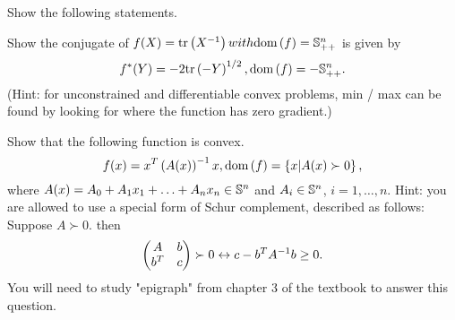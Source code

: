 \documentclass{exam}
\begin{document}
\begin{questions}
    \question Show the following statements.



    \question Show the conjugate of $f(X) = \tr{X^\inv} with \dom{f} = \S_{++}^n$ is given by
    $$f^*(Y) = -2\tr{-Y}^{1 / 2}, \dom{f} = -\S_{++}^n.$$
    (Hint: for unconstrained and differentiable convex problems, min / max can be found by looking for where the function
    has zero gradient.)

    \question Show that the following function is convex.
    $$f(x) = x^T\paren{A(x)}^\inv x, \dom{f} = \cbrac{x | A(x) \succ 0},$$
    where $A(x) = A_0 + A_1x_1 + \hdots + A_nx_n \in\S^n$ and $A_i\in\S^n$, $i = 1, \hdots, n$. Hint: you are allowed to use
    a special form of Schur complement, described as follows: Suppose $A \succ 0$. then
    $$\paren{\begin{matrix}
        A & b \\
        b^T & c
    \end{matrix}} \succ 0 \leftrightarrow c - b^TA^\inv b \geq 0.$$
    You will need to study "epigraph" from chapter 3 of the textbook to answer this question.


\end{questions}
\end{document}
